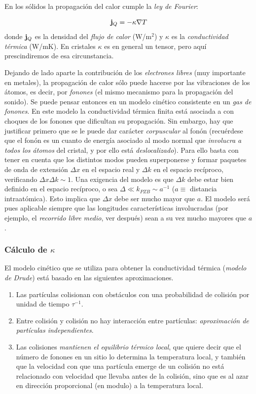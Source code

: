 En los sólidos la propagación del calor cumple la \textit{ley de Fourier}:

\begin{equation}
    \mathbf{j}_Q = - \kappa \nabla T
\end{equation}
donde $\mathbf{j}_Q$ es la densidad del \textit{flujo de calor} (W/m$^2$) y $\kappa$ es la \textit{conductividad térmica} (W/mK). En cristales $\kappa$ es en general un tensor, pero aquí prescindiremos de esa circunstancia.

Dejando de lado aparte la contribución de los \textit{electrones libres} (muy importante en metales), la propagación de calor sólo puede hacerse por las vibraciones de los átomos, es decir, por \textit{fonones} (el mismo mecanismo para la propagación del sonido). Se puede pensar entonces en un modelo cinético consistente en un \textit{gas de fonones}. En este modelo la conductividad térmica finita está asociada a con choques de los fonones que dificultan su propagación. Sin embargo, hay que justificar primero que se le puede dar carácter \textit{corpuscular} al fonón (recuérdese que el fonón es un cuanto de energía asociado al modo normal que \textit{involucra a todos los átomos} del cristal, y por ello está \textit{deslocalizado}). Para ello basta con tener en cuenta que los distintos modos pueden superponerse y formar paquetes de onda de extensión $\Delta x$ en el espacio real y $\Delta k$ en el espacio recíproco, verificando $\Delta x \Delta k \sim 1$. Una exigencia del modelo es que $\Delta k$ debe estar bien definido en el espacio recíproco, o sea $\Delta \ll k_{PZB} \sim a^{-1}$ ($a\equiv$ distancia intraatómica). Esto implica que $\Delta x$ debe ser mucho mayor que $a$. El modelo será pues aplicable siempre que las longitudes características involucradas (por ejemplo, el \textit{recorrido libre medio}, ver después) sean a su vez mucho mayores que $a$. 

\subsubsection{Cálculo de $\kappa$}

El modelo cinético que se utiliza para obtener la conductividad térmica (\textit{modelo de Drude}) está basado en las siguientes aproximaciones.

\begin{enumerate}
\item Las partículas colisionan con obstáculos con una probabilidad de colisión por unidad de tiempo $\tau^{-1}$. 
\item Entre colisión y colisión no hay interacción entre partículas: \textit{aproximación de partículas independientes}.
\item Las colisiones \textit{mantienen el equilibrio térmico local}, que quiere decir que el número de fonones en un sitio lo determina la temperatura local, y también que la velocidad con que una partícula emerge de un colisión no está relacionado con velocidad que llevaba antes de la colisión, sino que es al azar en dirección proporcional (en modulo) a la temperatura local.
\end{enumerate}

